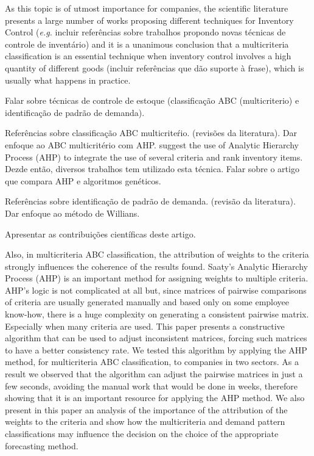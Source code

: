 \documentclass[authoryear,manuscript,12pt]{elsarticle}
\begin{document}
As this topic is of utmost importance for companies, the scientific literature presents a large number of works proposing different techniques for Inventory Control (\emph{e.g.} incluir referências sobre trabalhos propondo novas técnicas de controle de inventário) and it is a unanimous conclusion that a multicriteria classification is an essential technique when inventory control involves a high quantity of different goods (incluir referências que dão suporte à frase), which is usually what happens in practice. 

Falar sobre técnicas de controle de estoque (classificação ABC (multicriterio) e identificação de padrão de demanda).

Referências sobre classificação ABC multicriteŕio. (revisões da literatura). Dar enfoque ao ABC multicritério com AHP. \cite{FloresEtAl1992} suggest the use of Analytic Hierarchy Process (AHP) to integrate the use of several criteria and rank inventory items. Dezde então, diversos trabalhos tem utilizado esta técnica. Falar sobre o artigo que compara AHP e algoritmos genéticos.

Referências sobre identificação de padrão de demanda. (revisão da literatura). Dar enfoque ao método de Willians.

Apresentar as contribuições científicas deste artigo.

Also, in multicriteria ABC classification, the attribution of weights to the criteria strongly influences the coherence of the results found. Saaty's Analytic Hierarchy Process (AHP) is an important method for assigning weights to multiple criteria.  AHP's logic is not complicated at all but, since matrices of pairwise comparisons of criteria  are usually generated manually and based only on some employee know-how, there is a huge complexity on generating a consistent pairwise matrix. Especially when many criteria are used. This paper presents a constructive algorithm that can be used to adjust inconsistent matrices, forcing such matrices to have a better consistency rate. We tested this algorithm by applying the AHP method, for multicriteria ABC classification, to companies in two sectors. As a result we observed that the algorithm can adjust the pairwise matrices in just a few seconds, avoiding the manual work that would be done in weeks, therefore showing that it is an important resource for applying the AHP method. We also present in this paper an analysis of the importance of the attribution of the weights to the criteria and show how the multicriteria and demand pattern classifications may influence the decision on the choice of the appropriate forecasting method.
\end{document}
